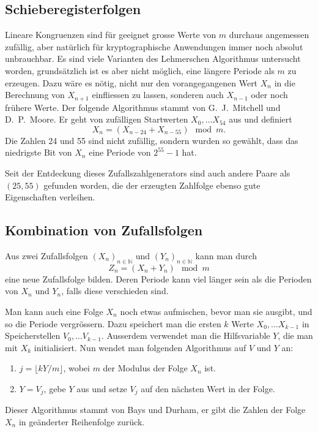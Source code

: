\subsection{Schieberegisterfolgen}
Lineare Kongruenzen sind für geeignet grosse Werte von $m$ durchaus
angemessen
zufällig, aber natürlich für kryptographische Anwendungen immer noch
absolut unbrauchbar.
Es sind viele Varianten des Lehmerschen Algorithmus
untersucht worden, grundsätzlich ist es aber nicht möglich, eine längere
Periode als $m$ zu erzeugen.
Dazu wäre es nötig, nicht nur den
vorangegangenen Wert $X_n$ in die Berechnung von $X_{n+1}$ einfliessen
zu lassen, sonderen auch $X_{n-1}$ oder noch frühere Werte.
Der folgende
Algorithmus stammt von G.~J.~Mitchell und D.~P.~Moore.
Er geht von
zufälligen Startwerten $X_0,\dots X_{54}$ aus und definiert
\begin{equation}
X_n=(X_{n-24}+X_{n-55})\mod m.
\end{equation}
Die Zahlen 24 und 55 sind nicht zufällig, sondern wurden so gewählt,
dass das niedrigste Bit von $X_n$ eine Periode von $2^{55}-1$ hat.

Seit der Entdeckung dieses Zufallszahlgenerators sind auch andere Paare
als $(25,55)$ gefunden worden, die der erzeugten Zahlfolge ebenso gute
Eigenschaften  verleihen.

\subsection{Kombination von Zufallsfolgen}
Aus zwei Zufallsfolgen $(X_n)_{n\in\mathbb{N}}$ und $(Y_n)_{n\in\mathbb{N}}$
kann man durch 
\begin{equation}
Z_n=(X_n+Y_n)\mod m
\end{equation}
eine neue Zufallsfolge bilden.
Deren Periode kann viel länger sein als die
Perioden von $X_n$ und $Y_n$, falls diese verschieden sind.

Man kann auch eine Folge $X_n$ noch etwas aufmischen, bevor man sie ausgibt,
und so die Periode vergrössern.
Dazu speichert man die ersten $k$
Werte $X_0,\dots X_{k-1}$ in Speicherstellen $V_0,\dots V_{k-1}$.
Ausserdem
verwendet man die Hilfsvariable $Y$, die man mit $X_k$ initialisiert.
Nun wendet man folgenden Algorithmus auf $V$ und $Y$ an:
\begin{enumerate}
\item $j = \lfloor kY/m\rfloor$, wobei $m$ der Modulus der Folge $X_n$ ist.
\item $Y = V_j$, gebe $Y$ aus und setze $V_j$ auf den nächsten Wert
in der Folge.
\end{enumerate}
Dieser Algorithmus stammt von Bays und Durham, er gibt die Zahlen der
Folge $X_n$ in geänderter Reihenfolge zurück.

